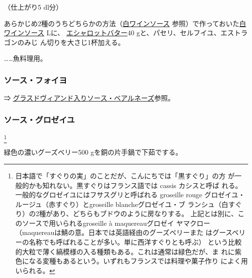 \begin{recette}
（仕上がり5 dl分）

あらかじめ2種のうちどちらかの方法（\protect\hyperlink{sauce-vin-blanc}{白ワインソース}
参照）で作っておいた\protect\hyperlink{sauce-vin-blanc}{白ワインソース}\undemi{}
Lに、 \protect\hyperlink{beurre-d-echalote}{エシャロットバター}40
gと、パセリ、セルフイユ、エストラゴンのみじ
ん切りを大さじ1\undemi{}杯加える。

\ldots{}\ldots{}魚料理用。

\maeaki

\hypertarget{sauce-foyot}{%
\subsubsection{ソース・フォイヨ}\label{sauce-foyot}}


⇒
\protect\hyperlink{sauce-bearnaise-a-la-glace-de-viande}{グラスドヴィアンド入りソース・ベアルネーズ}参照。

\maeaki

\hypertarget{sauce-groseilles}{%
\subsubsection{ソース・グロゼイユ}\label{sauce-groseilles}}

\footnote{日本語で「すぐりの実」のことだが、こんにちでは「黒すぐり」の方
  が一般的かも知れない。黒すぐりはフランス語では cassis カシスと呼ば
  れる。一般的なグロゼイユにはフサスグリと呼ばれる groseille rouge
  グロゼイユ・ルージュ（赤すぐり）とgroseille blancheグロゼイユ・ブ
  ランシュ（白すぐり）の2種があり、どちらもブドウのように房なりする。
  上記とは別に、このソースで用いられるgroseille à maquereauグロゼイ
  ヤマクロー（maquereauは鯖の意。日本では英語経由のグーズベリーまた
  はグースベリーの名称でも呼ばれることが多い。単に西洋すぐりとも呼ぶ）
  という比較的大粒で薄く縞模様の入る種類もある。これは通常は緑色だが、ま
  れに紫色になる変種もあるという。いずれもフランスでは料理や菓子作り
  によく用いられる。}


緑色の濃いグーズベリー500 gを銅の片手鍋で下茹でする。


\end{recette}
